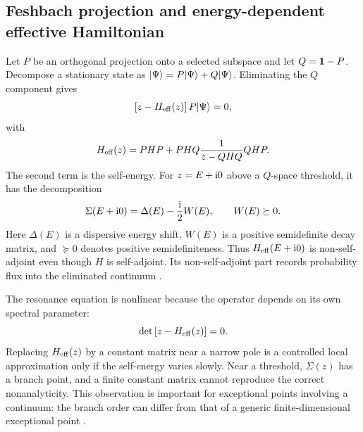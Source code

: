 \subsection{Feshbach projection and energy-dependent effective Hamiltonian}
\label{subsec:feshbach}

Let $P$ be an orthogonal projection onto a selected subspace and let
$Q=\mathbf{1}-P$.  Decompose a stationary state as
$\lvert \Psi \rangle=P\lvert \Psi \rangle+Q\lvert \Psi \rangle$.  Eliminating the $Q$ component gives
\begin{equation}
  \left[z-H_{\mathrm{eff}}(z)\right]P\lvert \Psi \rangle=0,
  \label{eq:feshbach-equation}
\end{equation}
with
\begin{equation}
  H_{\mathrm{eff}}(z)
  =PHP+PHQ\frac{1}{z-QHQ}QHP .
  \label{eq:feshbach-H}
\end{equation}
The second term is the self-energy.  For $z=E+\mathrm{i}0$ above a $Q$-space
threshold, it has the decomposition
\begin{equation}
  \Sigma(E+\mathrm{i}0)
  =\Delta(E)-\frac{\mathrm{i}}{2}W(E),
  \qquad W(E)\succeq0 .
  \label{eq:self-energy-decomposition}
\end{equation}
Here $\Delta(E)$ is a dispersive energy shift, $W(E)$ is a positive
semidefinite decay matrix, and $\succeq0$ denotes positive semidefiniteness.
Thus $H_{\mathrm{eff}}(E+\mathrm{i}0)$ is non-self-adjoint even though $H$ is
self-adjoint.  Its non-self-adjoint part records probability flux into the
eliminated continuum
\cite{Feshbach1958UnifiedI,Feshbach1962UnifiedII,Rotter:2007zng}.

The resonance equation is nonlinear because the operator depends on its own
spectral parameter:
\begin{equation}
  \det\left[z-H_{\mathrm{eff}}(z)\right]=0 .
  \label{eq:feshbach-pole-equation}
\end{equation}
Replacing $H_{\mathrm{eff}}(z)$ by a constant matrix near a narrow pole is a
controlled local approximation only if the self-energy varies slowly.  Near a
threshold, $\Sigma(z)$ has a branch point, and a finite constant matrix cannot
reproduce the correct nonanalyticity.  This observation is important for
exceptional points involving a continuum: the branch order can differ from
that of a generic finite-dimensional exceptional point
\cite{Garmon2021AnomalousEP}.

